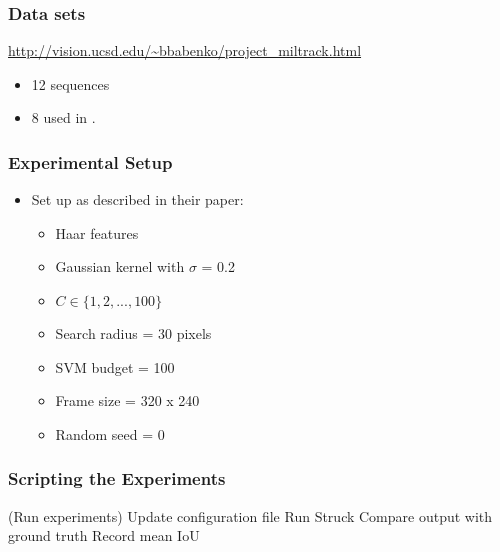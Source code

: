 
\begin{frame}
    \frametitle{Data sets}
    \url{http://vision.ucsd.edu/~bbabenko/project_miltrack.html}
    \begin{itemize}
        \item 12 sequences
        \item 8 used in \cite{6126251}.
    \end{itemize}
\end{frame}

\begin{frame}
    \frametitle{Experimental Setup}
    \begin{itemize}
        \item Set up as described in their paper:
            \begin{itemize}
                \item Haar features
                \item Gaussian kernel with \(\sigma\) = 0.2
                \item \(C \in \{1, 2, ..., 100\}\)
                \item Search radius = 30 pixels
                \item SVM budget = 100
                \item Frame size = 320 x 240
                \item Random seed = 0
            \end{itemize}
    \end{itemize}
\end{frame}

\begin{frame}
    \frametitle{Scripting the Experiments}
    \begin{algorithm}[H]
        \DontPrintSemicolon
        \Begin(Run experiments)
        {
            {
                {
                    Update configuration file\;
                    Run Struck\;
                    Compare output with ground truth\;
                    Record mean IoU\;
                }
            }
        }
    \end{algorithm}
\end{frame}

